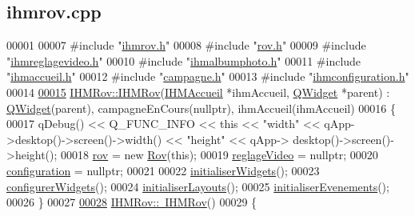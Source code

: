\hypertarget{ihmrov_8cpp_source}{}\subsection{ihmrov.\+cpp}
\label{ihmrov_8cpp_source}

\begin{DoxyCode}
00001 
00007 \textcolor{preprocessor}{#include "\hyperlink{ihmrov_8h}{ihmrov.h}"}
00008 \textcolor{preprocessor}{#include "\hyperlink{rov_8h}{rov.h}"}
00009 \textcolor{preprocessor}{#include "\hyperlink{ihmreglagevideo_8h}{ihmreglagevideo.h}"}
00010 \textcolor{preprocessor}{#include "\hyperlink{ihmalbumphoto_8h}{ihmalbumphoto.h}"}
00011 \textcolor{preprocessor}{#include "\hyperlink{ihmaccueil_8h}{ihmaccueil.h}"}
00012 \textcolor{preprocessor}{#include "\hyperlink{campagne_8h}{campagne.h}"}
00013 \textcolor{preprocessor}{#include "\hyperlink{ihmconfiguration_8h}{ihmconfiguration.h}"}
00014 
\hyperlink{class_i_h_m_rov_a403274da2bd4ca316f2f1b64a48a315b}{00015} \hyperlink{class_i_h_m_rov_a403274da2bd4ca316f2f1b64a48a315b}{IHMRov::IHMRov}(\hyperlink{class_i_h_m_accueil}{IHMAccueil} *ihmAccueil, \hyperlink{class_q_widget}{QWidget} *parent) : 
      \hyperlink{class_q_widget}{QWidget}(parent), campagneEnCours(nullptr), ihmAccueil(ihmAccueil)
00016 \{    
00017     qDebug() << Q\_FUNC\_INFO << \textcolor{keyword}{this} << \textcolor{stringliteral}{"width"} << qApp->desktop()->screen()->width() << \textcolor{stringliteral}{"height"} << qApp->
      desktop()->screen()->height();
00018     \hyperlink{class_i_h_m_rov_a777ca33fdb295ba6b6773e880356fa1e}{rov} = \textcolor{keyword}{new} \hyperlink{class_rov}{Rov}(\textcolor{keyword}{this});
00019     \hyperlink{class_i_h_m_rov_a6baa53853d29151404e6ae3dec5d2003}{reglageVideo} = \textcolor{keyword}{nullptr};
00020     \hyperlink{class_i_h_m_rov_a29f4de081899d8830376f1ad27e74647}{configuration} = \textcolor{keyword}{nullptr};
00021 
00022     \hyperlink{class_i_h_m_rov_a77d08efdfc3292d215af4df0e1af33a8}{initialiserWidgets}();
00023     \hyperlink{class_i_h_m_rov_aba47130fb875a01eefa09bc875affe6c}{configurerWidgets}();
00024     \hyperlink{class_i_h_m_rov_aa900473297415bf43a13c4152034135a}{initialiserLayouts}();
00025     \hyperlink{class_i_h_m_rov_a61e34efc084bba9934bce0d91448ea04}{initialiserEvenements}();
00026 \}
00027 
\hyperlink{class_i_h_m_rov_ab861463889934a3b6083b7a29c6adf45}{00028} \hyperlink{class_i_h_m_rov_ab861463889934a3b6083b7a29c6adf45}{IHMRov::~IHMRov}()
00029 \{

\end{DoxyCode}
